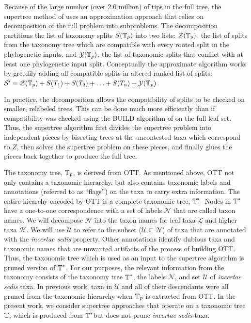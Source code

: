 \documentclass[english]{article}
\begin{document}
Because of the large number (over 2.6 million) of tips in the full
tree, the supertree method of \citet{redelings2017supertree} uses an
approximation approach that relies on decomposition of the full
problem into subproblems.
The decomposition partitions the list of
taxonomy splits $S(\mbox{\ensuremath{\mathbb{T}}}_{p})$ into two lists:
$\mathcal{Z}(\mbox{\ensuremath{\mathbb{T}}}_{p}),$ the list of splits from the taxonomy tree
which are compatible with every rooted split in the phylogenetic
inputs, and $\mathcal{Y}(\mbox{\ensuremath{\mathbb{T}}}_{p})$, the list of taxonomic splits
that conflict with at least one phylogenetic input split.
Conceptually
the approximate algorithm works by greedily adding all compatible
splits in altered ranked list of splits:
$\mathcal{S}^{\prime}=\mathcal{Z}(\mbox{\ensuremath{\mathbb{T}}}_{p})+S(T_{1})+S(T_{2})+\ldots+S(T_{n})+\mathcal{Y}(\mbox{\ensuremath{\mathbb{T}}}_{p})$.

In practice, the decomposition allows the compatibility of splits to
be checked on smaller, relabeled trees.
This can be done much more
efficiently than if compatibility was checked using the BUILD
algorithm of \citet{AhoSSU1981} on the full leaf set.
Thus, the
supertree algorithm first divides the supertree problem into
independent pieces by bisecting trees at the uncontested taxa which
correspond to $Z$, then solves the supertree problem on these pieces,
and finally glues the pieces back together to produce the full tree.

The taxonomy tree, $\mbox{\ensuremath{\mathbb{T}}}_{p}$, is derived from OTT.
As mentioned
above, OTT not only contains a taxonomic hierarchy, but also contains
taxonomic labels and annotations (referred to as ``flags'') on the
taxa to carry extra information.
The entire hiearchy encoded by OTT is
a complete taxonomic tree, $\mbox{\ensuremath{\mathbb{T}}}^{\ast}.$ Nodes in
$\mbox{\ensuremath{\mathbb{T}}}^{\ast}$ have a one-to-one correspondence with a set of
labels $\mathcal{N}$ that are called taxon names.
We will decompose
$\mathcal{N}$ into the taxon names for leaf taxa \emph{$\mathcal{L}$
}and higher taxa $\mathcal{H}$.
We will use $\mathcal{U}$ to refer to
the subset ($\mathcal{U}\subseteq\mathcal{N}$) of taxa that are
annotated with the \emph{incertae sedis }property.
Other annotations
identify dubious taxa and taxonomic names that are unwanted artifacts
of the process of building OTT.
Thus, the taxonomic tree which is used
as an input to the supertree algorithm is pruned version of
$\mbox{\ensuremath{\mathbb{T}}}^{\ast}$.
For our purposes, the relevant information from
the taxonomy consists of the taxonomy tree $\mbox{\ensuremath{\mathbb{T}}}^{\ast}$, the
labels $\mathcal{N}$, and set $\mathcal{U}$ of \emph{incertae sedis} taxa.
In previous work, taxa in $\mathcal{U}$ and all of their descendants 
were all pruned from
the taxonomic hierarchy when $\mbox{\ensuremath{\mathbb{T}}}_{p}$ is extracted from OTT.
In
the present work, we consider supertree approaches that operate on a
taxonomic tree $\mbox{\ensuremath{\mathbb{T}}}$, which is produced from
$\mbox{\ensuremath{\mathbb{T}}}^{\ast}$but does not prune \emph{incertae sedis} taxa.
\end{document}
